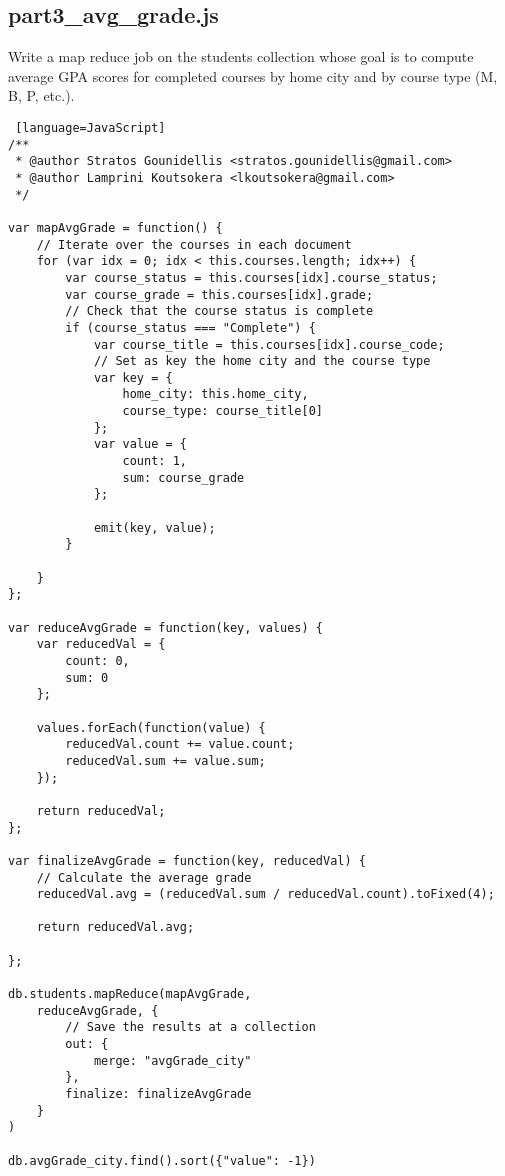 \documentclass[11pt]{article}
\begin{document}
\subsection{part3\_avg\_grade.js}\label{part3avggrade.js}
\noindent
Write a map reduce job on the students collection whose goal is to compute average GPA scores for completed courses by home city and by course type (M, B, P, etc.).
\begin{lstlisting} [language=JavaScript]
/**
 * @author Stratos Gounidellis <stratos.gounidellis@gmail.com>
 * @author Lamprini Koutsokera <lkoutsokera@gmail.com>
 */

var mapAvgGrade = function() {
    // Iterate over the courses in each document
    for (var idx = 0; idx < this.courses.length; idx++) {
        var course_status = this.courses[idx].course_status;
        var course_grade = this.courses[idx].grade;
        // Check that the course status is complete
        if (course_status === "Complete") {
            var course_title = this.courses[idx].course_code;
            // Set as key the home city and the course type
            var key = {
                home_city: this.home_city,
                course_type: course_title[0]
            };
            var value = {
                count: 1,
                sum: course_grade
            };

            emit(key, value);
        }

    }
};

var reduceAvgGrade = function(key, values) {
    var reducedVal = {
        count: 0,
        sum: 0
    };

    values.forEach(function(value) {
        reducedVal.count += value.count;
        reducedVal.sum += value.sum;
    });

    return reducedVal;
};

var finalizeAvgGrade = function(key, reducedVal) {
    // Calculate the average grade
    reducedVal.avg = (reducedVal.sum / reducedVal.count).toFixed(4);

    return reducedVal.avg;

};

db.students.mapReduce(mapAvgGrade,
    reduceAvgGrade, {
        // Save the results at a collection
        out: {
            merge: "avgGrade_city"
        },
        finalize: finalizeAvgGrade
    }
)

db.avgGrade_city.find().sort({"value": -1})
\end{lstlisting}
{} 
\end{document}

